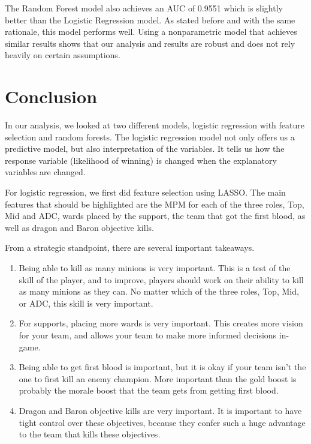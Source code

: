 \documentclass[runningheads]{llncs}
\begin{document}
	The Random Forest model also achieves an AUC of 0.9551 which is slightly better than the Logistic Regression model. As stated before and with the same rationale, this model performs well. Using a nonparametric model that achieves similar results shows that our analysis and results are robust and does not rely heavily on certain assumptions.
	
	\section{Conclusion}
	
	In our analysis, we looked at two different models, logistic regression with feature selection and random forests. The logistic regression model not only offers us a predictive model, but also interpretation of the variables. It tells us how the response variable (likelihood of winning) is changed when the explanatory variables are changed.

	For logistic regression, we first did feature selection using LASSO. The main features that should be highlighted are the MPM for each of the three roles, Top, Mid and ADC, wards placed by the support, the team that got the first blood, as well as dragon and Baron objective kills.

	From a strategic standpoint, there are several important takeaways.
	
	\begin{enumerate}
		\item
		Being able to kill as many minions is very important. This is a test of the skill of the player, and to improve, players should work on their ability to kill as many minions as they can. No matter which of the three roles, Top, Mid, or ADC, this skill is very important.
		
		\item
		For supports, placing more wards is very important. This creates more vision for your team, and allows your team to make more informed decisions in-game.
		
		\item
		Being able to get first blood is important, but it is okay if your team isn’t the one to first kill an enemy champion. More important than the gold boost is probably the morale boost that the team gets from getting first blood.
		
		\item
		Dragon and Baron objective kills are very important. It is important to have tight control over these objectives, because they confer such a huge advantage to the team that kills these objectives.
	\end{enumerate}
	
\end{document}
